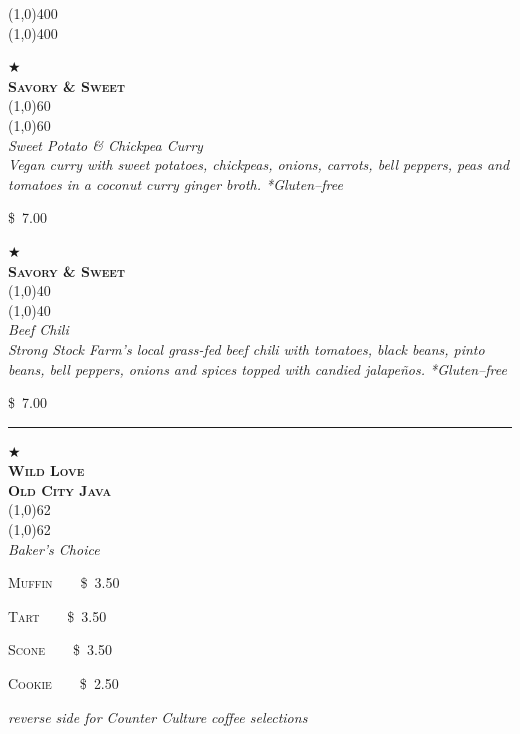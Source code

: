 \documentclass[letterpaper, 12pt]{article}%
\newcommand{\menuitem}[4]{
 \centering
  $\bigstar$\\
  \smallskip\vspace{0.1em}
  \textbf{\sffamily \textsc{\large#2}}\vspace{-1ex}\\
  \line(1,0){#1}\vspace{-2ex}\\
  \line(1,0){#1}\vspace{0.5ex}\\
  \smallskip
  \emph{\footnotesize#3}\\
  \vspace*{\fill}
  {\small#4}
}
\newcommand{\flowtherefore}{~~\raisebox{0.2ex}{$\therefore$}~~}
\newcommand{\price}[2]{
 \textsc{\small#1}\flowtherefore\$~\textsc{\small#2}
}
\newcommand{\varprice}[1]{
 \$~\textsc{\small#1}
}
\newcommand{\heading}[1]{{\large\bfseries #1\par}}
\newcommand{\flowentry}[1]{
{\calligra\centering\heading{\Huge #1}\vspace{-2ex}

\line(1,0){400}\vspace{-3ex}\\
\line(1,0){400}\vspace{-2ex}

}}
\begin{document}
\flowentry{}


\newlength{\ssminihi}
\newlength{\ssminiwi}
\newlength{\ocminiwi}
\setlength{\ssminihi}{0.14\textwidth}
\setlength{\ssminiwi}{0.55\textwidth}
\setlength{\ocminiwi}{0.15\textwidth}

{\centering
\begin{minipage}{0.5\textwidth}
{\centering
\begin{minipage}[t][\ssminihi][b]{\ssminiwi}
 \centering
 \menuitem{60}{
  Savory \& Sweet}{
  \textup{\normalsize Sweet Potato \& Chickpea Curry}\\
  Vegan curry with sweet potatoes, chickpeas, onions, carrots, bell peppers, peas and tomatoes in a coconut curry ginger broth. *Gluten--free
  }{
  \varprice{7.00}
 }
\end{minipage}

\rule{0pt}{2em}

\begin{minipage}[t][\ssminihi][b]{\ssminiwi}
 \centering
 \menuitem{40}{
  Savory \& Sweet}{
  \textup{\normalsize Beef Chili}\\
  Strong Stock Farm's local grass-fed beef chili with tomatoes, black beans, pinto beans, bell peppers, onions and spices topped with candied jalape\~{n}os. *Gluten--free
  }{
  \varprice{7.00}
 }
\end{minipage}

}
\end{minipage}
\rule{2em}{0pt}
\begin{minipage}{0.3\textwidth}
{\centering
\begin{minipage}{\ssminihi}
 \menuitem{62}{Wild Love\\Old City Java}{
  \textup{\normalsize Baker's Choice}\vspace{1ex}
  }{
  \price{Muffin}{3.50}
  
  \price{Tart}{3.50}
  
  \price{Scone}{3.50}
  
  \price{Cookie}{2.50}
 }
\end{minipage}

}
\end{minipage}

}


\begin{minipage}{\textwidth}
\end{minipage}

{\centering
\emph{reverse side for Counter Culture coffee selections}

}
\clearpage
\end{document}
